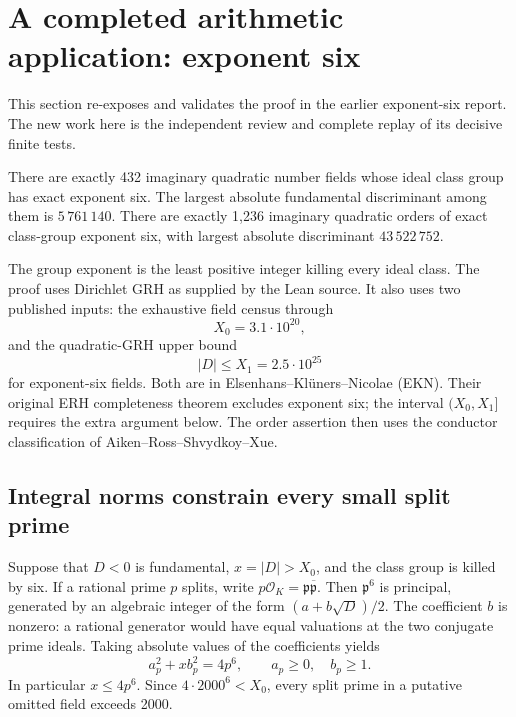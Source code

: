 \section{A completed arithmetic application: exponent six}
\label{sec:census}

This section re-exposes and validates the proof in the earlier exponent-six report. The new work here is the independent review and complete replay of its decisive finite tests.\cite{priorSix}

\begin{theorem}
There are exactly 432 imaginary quadratic number fields whose ideal class group has exact exponent six. The largest absolute fundamental discriminant among them is $5\,761\,140$. There are exactly 1,236 imaginary quadratic orders of exact class-group exponent six, with largest absolute discriminant $43\,522\,752$.
\end{theorem}

The group exponent is the least positive integer killing every ideal class. The proof uses Dirichlet GRH as supplied by the Lean source. It also uses two published inputs: the exhaustive field census through
\[
 X_0=3.1\cdot10^{20},
\]
and the quadratic-GRH upper bound
\[
 |D|\le X_1=2.5\cdot10^{25}
\]
for exponent-six fields. Both are in Elsenhans--Kl\"uners--Nicolae (EKN). Their original ERH completeness theorem excludes exponent six; the interval $(X_0,X_1]$ requires the extra argument below. The order assertion then uses the conductor classification of Aiken--Ross--Shvydkoy--Xue.\cite{EKN,ARSX}

\subsection{Integral norms constrain every small split prime}

Suppose that $D<0$ is fundamental, $x=|D|>X_0$, and the class group is killed by six. If a rational prime $p$ splits, write $p\mathcal O_K=\mathfrak p\overline{\mathfrak p}$. Then $\mathfrak p^6$ is principal, generated by an algebraic integer of the form $(a+b\sqrt D)/2$. The coefficient $b$ is nonzero: a rational generator would have equal valuations at the two conjugate prime ideals. Taking absolute values of the coefficients yields
\begin{equation}\label{eq:norm6}
 a_p^2+x b_p^2=4p^6,\qquad a_p\ge0,\quad b_p\ge1.
\end{equation}
In particular $x\le4p^6$. Since $4\cdot2000^6<X_0$, every split prime in a putative omitted field exceeds 2000.

